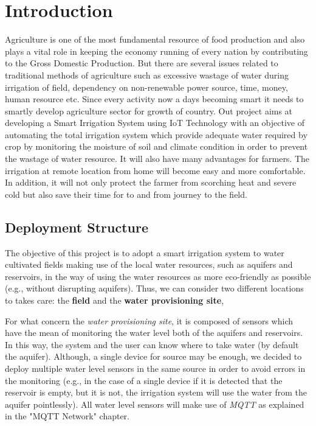 \section{Introduction}
Agriculture is one of the most fundamental resource of food production and also plays a vital role in keeping the economy running of every nation by contributing to the Gross Domestic Production. But there are several issues related to traditional methods of agriculture such as excessive wastage of water during irrigation of field, dependency on non-renewable power source, time, money, human resource etc. Since every activity now a days becoming smart it needs to smartly develop agriculture sector for growth of country. Out project aims at developing a Smart Irrigation System using IoT Technology with an objective of automating the total irrigation system which provide adequate water required by crop by monitoring the moisture of soil and climate condition in order to prevent the wastage of water resource. It will also have many advantages for farmers. The irrigation at remote location from home will become easy and more comfortable. In addition, it will not only protect the farmer from scorching heat and severe cold but also save their time for to and from journey to the field.



\subsection{Deployment Structure}
The objective of this project is to adopt a smart irrigation system to water cultivated fields making use of the local water resources, such as aquifers and reservoirs, in the way of using the water resources as more eco-friendly as possible (e.g., without disrupting aquifers). Thus, we can consider two different locations to takes care: the \textbf{field} and the \textbf{water provisioning site},

For what concern the \textit{water provisioning site}, it is composed of sensors which have the mean of monitoring the water level both of the aquifers and reservoirs. In this way, the system and the user can know where to take water (by default the aquifer). Although, a single device for source may be enough, we decided to deploy multiple water level sensors in the same source in order to avoid errors in the monitoring (e.g., in the case of a single device if it is detected that the reservoir is empty, but it is not, the irrigation system will use the water from the aquifer pointlessly).
All water level sensors will make use of \textit{MQTT} as explained in the "MQTT Network" chapter.


